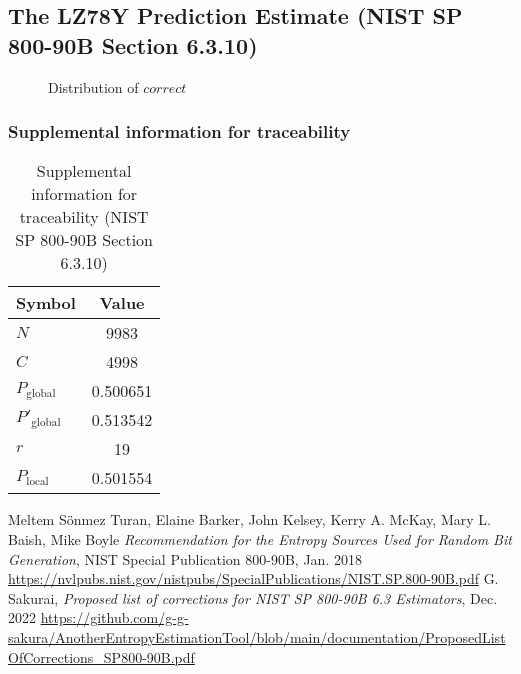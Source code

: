 \documentclass[a3paper,xelatex,english]{bxjsarticle}
\begin{document}
\subsection{The LZ78Y Prediction Estimate (NIST SP 800-90B Section 6.3.10)}
\begin{figure}[htbp]
\centering

\caption{Distribution of $correct$}
\end{figure}
\subsubsection{Supplemental information for traceability}
\renewcommand{\arraystretch}{1.8}
\begin{table}[h]
\caption{Supplemental information for traceability (NIST SP 800-90B Section 6.3.10)}
\begin{center}
\begin{tabular}{|l|c|}
\hline 
\rowcolor{anotherlightblue} %
Symbol				& Value \\ \hline 
$N$				& 9983\\ \hline 
$C$				& 4998\\ \hline 
$P_{\textrm{global}}$				& 0.500651\\ \hline 
$P'_{\textrm{global}}$			& 0.513542\\ \hline 
$r$				& 19\\ \hline 
$P_{\textrm{local}}$ 			& 0.501554\\ \hline
\end{tabular}
\end{center}
\end{table}
\renewcommand{\arraystretch}{1.4}
\begin{thebibliography}{99}
Meltem S\"{o}nmez Turan,
Elaine Barker,
John Kelsey,
Kerry A. McKay,
Mary L. Baish,
Mike Boyle
\textit{Recommendation for the Entropy Sources Used for Random Bit Generation},
NIST Special Publication 800-90B, Jan. 2018 
\url{https://nvlpubs.nist.gov/nistpubs/SpecialPublications/NIST.SP.800-90B.pdf}
G. Sakurai, \textit{Proposed list of corrections for NIST SP 800-90B 6.3 Estimators}, Dec. 2022 
\url{https://github.com/g-g-sakura/AnotherEntropyEstimationTool/blob/main/documentation/ProposedListOfCorrections_SP800-90B.pdf}
\end{thebibliography}
\end{document}
